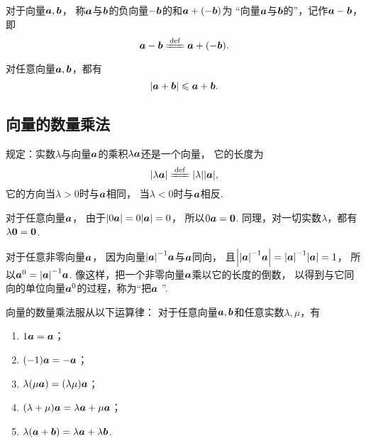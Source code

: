 \begin{definition}
对于向量\(\boldsymbol{a},\boldsymbol{b}\)，
称\(\boldsymbol{a}\)与\(\boldsymbol{b}\)的负向量\(-\boldsymbol{b}\)的和\(\boldsymbol{a}+(-\boldsymbol{b})\)为
“向量\(\boldsymbol{a}\)与\(\boldsymbol{b}\)的”，记作\(\boldsymbol{a}-\boldsymbol{b}\)，即\[
	\mat{a}-\mat{b}
	\defeq
	\mat{a}+(-\mat{b}).
\]
\end{definition}

\begin{theorem}
对任意向量\(\boldsymbol{a},\boldsymbol{b}\)，都有\[
	\abs{\boldsymbol{a}+\boldsymbol{b}} \leqslant \boldsymbol{a} + \boldsymbol{b}.
\]
\end{theorem}

\subsection{向量的数量乘法}
\begin{definition}
规定：实数\(\lambda\)与向量\(\boldsymbol{a}\)的乘积\(\lambda \boldsymbol{a}\)还是一个向量，
它的长度为\[
\abs{\lambda\mat{a}}
\defeq
\abs{\lambda} \abs{\mat{a}},
\]
它的方向当\(\lambda>0\)时与\(\boldsymbol{a}\)相同，
当\(\lambda<0\)时与\(\boldsymbol{a}\)相反.
\end{definition}

对于任意向量\(\boldsymbol{a}\)，
由于\(\abs{0 \boldsymbol{a}} = 0 \abs{\boldsymbol{a}} = 0\)，
所以\(0 \boldsymbol{a} = \boldsymbol{0}\).
同理，对一切实数\(\lambda\)，都有\(\lambda \boldsymbol{0} = \boldsymbol{0}\).

对于任意非零向量\(\boldsymbol{a}\)，
因为向量\(\abs{\boldsymbol{a}}^{-1} \boldsymbol{a}\)与\(\boldsymbol{a}\)同向，
且\(\abs{\abs{\boldsymbol{a}}^{-1} \boldsymbol{a}}
= \abs{\boldsymbol{a}}^{-1} \abs{\boldsymbol{a}} = 1\)，
所以\(\boldsymbol{a}^0 = \abs{\boldsymbol{a}}^{-1} \boldsymbol{a}\).
像这样，把一个非零向量\(\boldsymbol{a}\)乘以它的长度的倒数，
以得到与它同向的单位向量\(\boldsymbol{a}^0\)的过程，称为“把\(\boldsymbol{a}\) ”.

向量的数量乘法服从以下运算律：
对于任意向量\(\boldsymbol{a},\boldsymbol{b}\)和任意实数\(\lambda,\mu\)，有
\begin{enumerate}
	\item \(1 \boldsymbol{a} = \boldsymbol{a}\)；
	\item \((-1) \boldsymbol{a} = -\boldsymbol{a}\)；
	\item \(\lambda(\mu \boldsymbol{a}) = (\lambda \mu) \boldsymbol{a}\)；
	\item \((\lambda+\mu) \boldsymbol{a} = \lambda \boldsymbol{a} + \mu \boldsymbol{a}\)；
	\item \(\lambda (\boldsymbol{a}+\boldsymbol{b}) = \lambda \boldsymbol{a} + \lambda \boldsymbol{b}\).
\end{enumerate}


